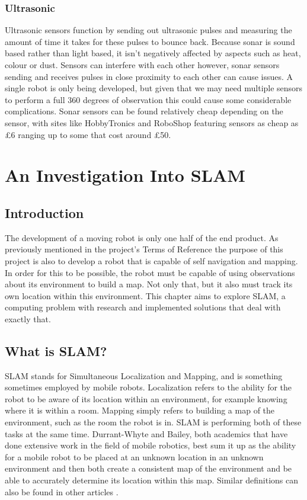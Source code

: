 				\subsection{Ultrasonic}
				Ultrasonic sensors function by sending out ultrasonic pulses and measuring the amount of time it takes for these pulses to bounce back. Because sonar is sound based rather than light based, it isn't negatively affected by aspects such as heat, colour or dust. Sensors can interfere with each other however, sonar sensors sending and receives pulses in close proximity to each other can cause issues. A single robot is only being developed, but given that we may need multiple sensors to perform a full 360 degrees of observation this could cause some considerable complications. Sonar sensors can be found relatively cheap depending on the sensor, with sites like HobbyTronics and RoboShop featuring sensors as cheap as \pounds{6} ranging up to some that cost around \pounds{50}.
				\medskip
				
		
		\chapter{An Investigation Into SLAM}
			\section{Introduction}
			The development of a moving robot is only one half of the end product. As previously mentioned in the project's Terms of Reference the purpose of this project is also to develop a robot that is capable of self navigation and mapping. In order for this to be possible, the robot must be capable of using observations about its environment to build a map. Not only that, but it also must track its own location within this environment. This chapter aims to explore SLAM, a computing problem with research and implemented solutions that deal with exactly that.
		
			\section{What is SLAM?}
			SLAM stands for Simultaneous Localization and Mapping, and is something sometimes employed by mobile robots. Localization refers to the ability for the robot to be aware of its location within an environment, for example knowing where it is within a room. Mapping simply refers to building a map of the environment, such as the room the robot is in. SLAM is performing both of these tasks at the same time. Durrant-Whyte and Bailey\citep{durrant2006simultaneous}, both academics that have done extensive work in the field of mobile robotics, best sum it up as the ability for a mobile robot to be placed at an unknown location in an unknown environment and then both create a consistent map of the environment and be able to accurately determine its location within this map. Similar definitions can also be found in other articles \citep{choset2001topological, dissanayake2001solution}.
		
